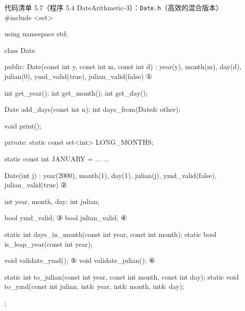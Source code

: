 \begin{codeboxt}{代码清单 5.7（程序 5.4 DateArithmetic-3）：\texttt{Date.h}（高效的混合版本）}
#include <set>

using namespace std;

class Date
{
public:
    Date(const int y, const int m, const int d)
        : year(y), month(m), day(d), julian(0),
          ymd_valid(true), julian_valid(false) {}  ①

    int get_year();
    int get_month();
    int get_day();

    Date add_days(const int n);
    int days_from(Date& other);

    void print();

private:
    static const set<int> LONG_MONTHS;

    static const int JANUARY  = ...
...

    Date(int j)
        : year(2000), month(1), day(1), julian(j),
          ymd_valid(false), julian_valid(true) {}  ②

    int year, month, day;   
    int julian;

    bool ymd_valid;                                ③
    bool julian_valid;                             ④

    static int days_in_month(const int year, const int month);
    static bool is_leap_year(const int year);

    void validate_ymd();                           ⑤
    void validate_julian();                        ⑥

    static int to_julian(const int year, const int month,
                         const int day);
    static void to_ymd(const int julian, int& year, int& month,
                                         int& day);
};
\end{codeboxt}
\par
{}\par
{}\par
{}\par
{}\par
{}\par

